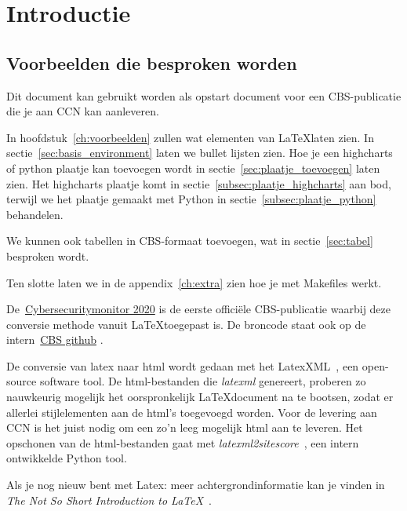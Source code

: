 \chapter{Introductie}
\label{ch:introductie}


\section{Voorbeelden die besproken worden}
Dit document kan gebruikt worden als opstart document voor een CBS-publicatie die je aan CCN kan
aanleveren.

In hoofdstuk~\ref{ch:voorbeelden}  zullen wat elementen van \LaTeX laten zien.
In sectie~\ref{sec:basis_environment} laten we bullet lijsten zien.
Hoe je een highcharts of python plaatje kan toevoegen wordt in sectie~\ref{sec:plaatje_toevoegen}
laten zien.
Het highcharts plaatje komt in sectie~\ref{subsec:plaatje_highcharts} aan bod, terwijl we het
plaatje gemaakt met Python in sectie~\ref{subsec:plaatje_python} behandelen.

We kunnen ook tabellen in CBS-formaat toevoegen, wat in sectie~\ref{sec:tabel} besproken wordt.

Ten slotte laten we in de appendix~\ref{ch:extra} zien hoe je met Makefiles werkt.

De~\href{https://github.cbsp.nl/EVLT/cybersecuritymonitor-2020}{Cybersecuritymonitor 2020}
\citep{cybersecuritymonitor_20} is de eerste officiële CBS-publicatie waarbij
deze conversie methode vanuit \LaTeX toegepast is.
De broncode staat ook op de intern~\href{https://github/evlt/cybersecuritymonitor}{CBS github}
\citep{cybersecuritymonitor_20_github}.

De conversie van latex naar html wordt gedaan met het LatexXML~\citep{latexml}, een open-source
software tool.
De html-bestanden die \emph{latexml} genereert, proberen zo nauwkeurig mogelijk het oorspronkelijk
\LaTeX document na te bootsen, zodat er allerlei stijlelementen aan de html's toegevoegd worden.
Voor de levering aan CCN is het juist nodig om een zo'n leeg mogelijk html aan te leveren.
Het opschonen van de html-bestanden gaat met
\emph{latexml2sitescore}~\citep{latexmlsitescore_github}, een intern ontwikkelde Python tool.

Als je nog nieuw bent met Latex: meer achtergrondinformatie kan je vinden in
\emph{The Not So Short Introduction to \LaTeX}~\citep{latexnottooshort}.



